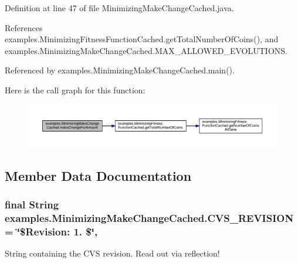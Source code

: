 Definition at line 47 of file Minimizing\-Make\-Change\-Cached.\-java.



References examples.\-Minimizing\-Fitness\-Function\-Cached.\-get\-Total\-Number\-Of\-Coins(), and examples.\-Minimizing\-Make\-Change\-Cached.\-M\-A\-X\-\_\-\-A\-L\-L\-O\-W\-E\-D\-\_\-\-E\-V\-O\-L\-U\-T\-I\-O\-N\-S.



Referenced by examples.\-Minimizing\-Make\-Change\-Cached.\-main().



Here is the call graph for this function\-:
\nopagebreak
\begin{figure}[H]
\begin{center}
\leavevmode
\includegraphics[width=350pt]{classexamples_1_1_minimizing_make_change_cached_a0563ae870981869a14e2fb1ead3446b6_cgraph}
\end{center}
\end{figure}




\subsection{Member Data Documentation}
\hypertarget{classexamples_1_1_minimizing_make_change_cached_a45708be5ccb1c5758ad866c6eda6e9b2}{
\subsubsection[{C\-V\-S\-\_\-\-R\-E\-V\-I\-S\-I\-O\-N}]{\setlength{\rightskip}{0pt plus 5cm}final String examples.\-Minimizing\-Make\-Change\-Cached.\-C\-V\-S\-\_\-\-R\-E\-V\-I\-S\-I\-O\-N = \char`\"{}\$Revision\-: 1. \$\char`\"{}\hspace{0.3cm}{\ttfamily [static]}, {\ttfamily [private]}}}\label{classexamples_1_1_minimizing_make_change_cached_a45708be5ccb1c5758ad866c6eda6e9b2}
String containing the C\-V\-S revision. Read out via reflection! 

